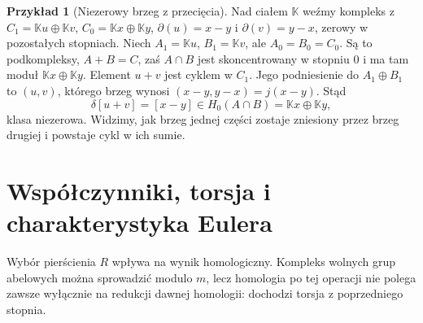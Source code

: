 \documentclass[11pt,a4paper,oneside]{report}
\theoremstyle{plain}
\theoremstyle{definition}
\newtheorem{przyklad}[twierdzenie]{Przykład}
\theoremstyle{remark}
\begin{document}
\begin{przyklad}[Niezerowy brzeg z przecięcia]
\label{prz:mv-niezerowa-delta}
Nad ciałem $\mathbb K$ weźmy kompleks
z $C_1=\mathbb K u\oplus\mathbb K v$,
$C_0=\mathbb K x\oplus\mathbb K y$,
$\partial(u)=x-y$ i $\partial(v)=y-x$,
zerowy w pozostałych stopniach.
Niech $A_1=\mathbb K u$, $B_1=\mathbb K v$,
ale $A_0=B_0=C_0$. Są to podkompleksy,
$A+B=C$, zaś $A\cap B$ jest
skoncentrowany w stopniu $0$
i ma tam moduł $\mathbb K x\oplus\mathbb K y$.
Element $u+v$ jest cyklem w $C_1$.
Jego podniesienie do $A_1\oplus B_1$ to $(u,v)$,
którego brzeg wynosi
$(x-y,y-x)=j(x-y)$. Stąd
\[
 \delta[u+v]=[x-y]
 \in H_0(A\cap B)=\mathbb K x\oplus\mathbb K y,
\]
klasa niezerowa. Widzimy, jak brzeg
jednej części zostaje zniesiony
przez brzeg drugiej i powstaje
cykl w ich sumie.
\end{przyklad}

\section{Współczynniki, torsja i charakterystyka Eulera}
\label{sec:wspolczynniki-euler}

Wybór pierścienia $R$ wpływa na
wynik homologiczny. Kompleks
wolnych grup abelowych
można sprowadzić modulo $m$,
lecz homologia po tej operacji
nie polega zawsze wyłącznie
na redukcji dawnej homologii:
dochodzi torsja z poprzedniego stopnia.
\end{document}
